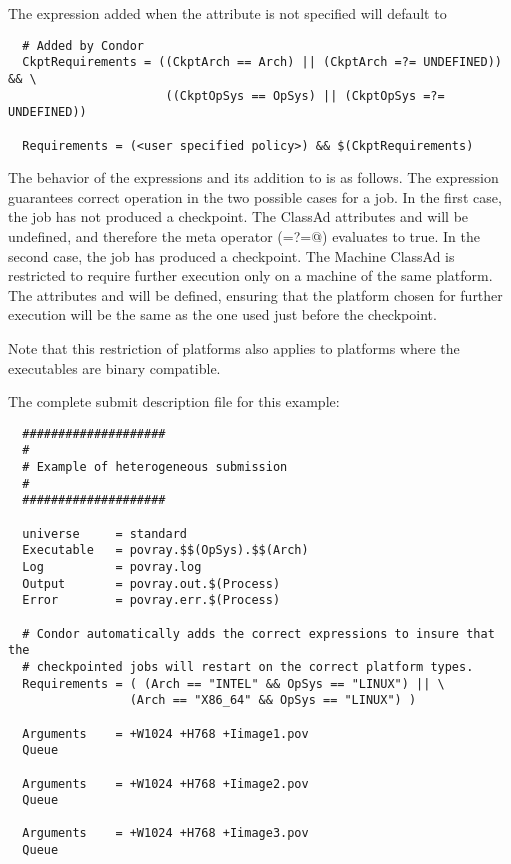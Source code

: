 The expression added when the attribute  is not specified 
will default to

\footnotesize
\begin{verbatim}
  # Added by Condor
  CkptRequirements = ((CkptArch == Arch) || (CkptArch =?= UNDEFINED)) && \
                      ((CkptOpSys == OpSys) || (CkptOpSys =?= UNDEFINED))

  Requirements = (<user specified policy>) && $(CkptRequirements)
\end{verbatim}
\normalsize

The behavior of the  expressions and its addition to
\AdAttr{requirements} is as follows.
The  expression guarantees correct operation
in the two possible cases for a job.
In the first case, the job has not produced a checkpoint.
The ClassAd attributes  and 
will be undefined, and therefore the meta operator (\verb@=?=@)
evaluates to true.
In the second case, the job has produced a checkpoint.
The Machine ClassAd is restricted to require further execution
only on a machine of the same platform.
The attributes  and 
will be defined, ensuring that the platform chosen for further
execution will be the same as the one used just before the
checkpoint.

Note that this restriction of platforms also applies to platforms where
the executables are binary compatible.

The complete submit description file for this example:

\begin{verbatim}
  ####################
  #
  # Example of heterogeneous submission
  #
  ####################

  universe     = standard
  Executable   = povray.$$(OpSys).$$(Arch)
  Log          = povray.log
  Output       = povray.out.$(Process)
  Error        = povray.err.$(Process)

  # Condor automatically adds the correct expressions to insure that the
  # checkpointed jobs will restart on the correct platform types.
  Requirements = ( (Arch == "INTEL" && OpSys == "LINUX") || \
                 (Arch == "X86_64" && OpSys == "LINUX") )

  Arguments    = +W1024 +H768 +Iimage1.pov
  Queue 

  Arguments    = +W1024 +H768 +Iimage2.pov
  Queue 

  Arguments    = +W1024 +H768 +Iimage3.pov
  Queue 
\end{verbatim}


